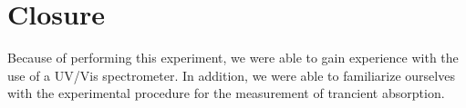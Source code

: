 
\chapter{Closure}
\label{chap:close}

Because of performing this experiment, we were able to gain experience with the use of a UV/Vis spectrometer. In addition, we were able to familiarize ourselves with the experimental procedure for the measurement of trancient absorption.